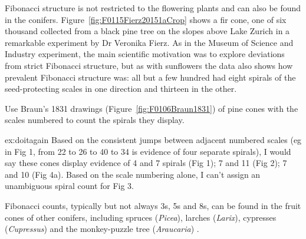 Fibonacci structure is not restricted to the flowering plants and can also be found in the conifers. 
Figure~\ref{fig:F0115Fierz20151aCrop} shows a fir cone, one of six thousand collected from a black pine tree on the slopes above Lake Zurich in a remarkable experiment by Dr Veronika Fierz. As in the Museum of Science and Industry experiment, the main scientific motivation was to explore deviations from strict Fibonacci structure, but as with sunflowers the data also shows how prevalent Fibonacci structure was: all but a few hundred had eight spirals of the seed-protecting scales in one direction and thirteen in the other. 
%

\begin{jExercise}
	\label{ex:doitagain}
	Use Braun's 1831 drawings (Figure~\ref{fig:F0106Braun1831}) of pine cones with the scales numbered to count the spirals they display.
\end{jExercise}
\begin{jAnswer}{ex:doitagain}
Based on the consistent jumps between adjacent numbered scales (eg in Fig 1, from 22 to 26 to 40 to 34 is evidence of four separate spirals), I would say these cones display evidence of 4 and 7 spirals (Fig 1); 7 and 11 (Fig 2); 7 and 10 (Fig 4a). Based on the scale numbering alone, I can't assign an unambiguous spiral count  for Fig 3. 
\end{jAnswer}

Fibonacci counts, typically but not always 3s, 5s and 8s, can be found in the fruit cones of other conifers, including spruces (\textit{Picea}), larches (\textit{Larix}),  cypresses (\textit{Cupressus}) \cite{fierzAberrantPhyllotacticPatterns2015} and the monkey-puzzle tree (\textit{Araucaria}) \cite{churchRelationPhyllotaxisMechanical1904}. 




